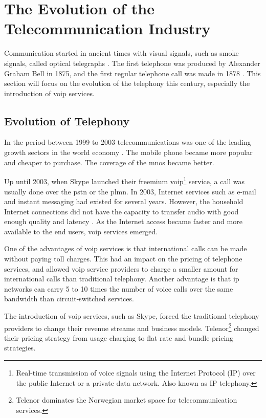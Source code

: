 \section{The Evolution of the Telecommunication Industry}
Communication started in ancient times with visual signals, such as smoke signals, called optical telegraphs \cite{itu50years}. The first telephone was produced by Alexander Graham Bell in 1875, and the first regular telephone call was made in 1878 \cite{hallock2004brief}. This section will focus on the evolution of the telephony this century, especially the introduction of \gls{voip} services. 


\subsection{Evolution of Telephony}
In the period between 1999 to 2003 telecommunications was one of the leading growth sectors in the world economy \cite{itu50years}. The mobile phone became more popular and cheaper to purchase. The coverage of the \glspl{mno} became better.

Up until 2003, when Skype launched their freemium \gls{voip}\footnote{Real-time transmission of voice signals using 
the Internet Protocol (IP) over the public Internet or a private data network. Also known as IP telephony.} service, a call was usually done over the \gls{pstn} or the \gls{plmn}. In 2003, Internet services such as e-mail and instant messaging had existed for several years. However, the household Internet connections did not have the capacity to transfer audio with good enough quality and latency \cite{thomasbruun}. As the Internet access became faster and more available to the end users, \gls{voip} services emerged. 

One of the advantages of \gls{voip} services is that international calls can be made without paying toll charges. This had an impact on the pricing of telephone services, and allowed \gls{voip} service providers to charge a smaller amount for international calls than traditional telephony. Another advantage is that \gls{ip} networks can carry 5 to 10 times the number of voice calls over the same bandwidth than circuit-switched services. 

The introduction of \gls{voip} services, such as Skype, forced the traditional telephony providers to change their revenue streams and business models. Telenor\footnote{Telenor dominates the Norwegian market space for telecommunication services.} changed their pricing strategy from usage charging to flat rate and bundle pricing strategies. 


